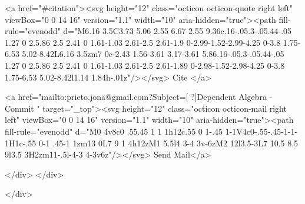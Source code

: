       <a  href="#citation"><svg height="12" class="octicon octicon-quote right left" viewBox="0 0 14 16" version="1.1" width="10" aria-hidden="true"><path fill-rule="evenodd" d="M6.16 3.5C3.73 5.06 2.55 6.67 2.55 9.36c.16-.05.3-.05.44-.05 1.27 0 2.5.86 2.5 2.41 0 1.61-1.03 2.61-2.5 2.61-1.9 0-2.99-1.52-2.99-4.25 0-3.8 1.75-6.53 5.02-8.42L6.16 3.5zm7 0c-2.43 1.56-3.61 3.17-3.61 5.86.16-.05.3-.05.44-.05 1.27 0 2.5.86 2.5 2.41 0 1.61-1.03 2.61-2.5 2.61-1.89 0-2.98-1.52-2.98-4.25 0-3.8 1.75-6.53 5.02-8.42l1.14 1.84h-.01z"/></svg> Cite
      </a>

      <a href="mailto:prieto.jona@gmail.com?Subject=[ ?]Dependent Algebra - Commit " target="_top"><svg height="12" class="octicon octicon-mail right left" viewBox="0 0 14 16" version="1.1" width="10" aria-hidden="true"><path fill-rule="evenodd" d="M0 4v8c0 .55.45 1 1 1h12c.55 0 1-.45 1-1V4c0-.55-.45-1-1-1H1c-.55 0-1 .45-1 1zm13 0L7 9 1 4h12zM1 5.5l4 3-4 3v-6zM2 12l3.5-3L7 10.5 8.5 9l3.5 3H2zm11-.5l-4-3 4-3v6z"/></svg> Send Mail</a>

    </div>
  </div>

</div>




